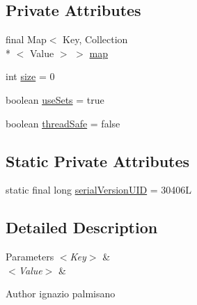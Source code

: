 \subsection*{Private Attributes}
\begin{DoxyCompactItemize}
\item 
final Map$<$ Key, Collection\\*
$<$ Value $>$ $>$ \hyperlink{classorg_1_1semanticweb_1_1owlapi_1_1util_1_1_multi_map_3_01_key_00_01_value_01_4_ab1a2523dd703a828e181a68f8761fcb4}{map}
\item 
int \hyperlink{classorg_1_1semanticweb_1_1owlapi_1_1util_1_1_multi_map_3_01_key_00_01_value_01_4_a47df3c0161c8f402af3d2fbf480d8c76}{size} = 0
\item 
boolean \hyperlink{classorg_1_1semanticweb_1_1owlapi_1_1util_1_1_multi_map_3_01_key_00_01_value_01_4_a5911e692ddf07ededda42d43d06b0215}{use\-Sets} = true
\item 
boolean \hyperlink{classorg_1_1semanticweb_1_1owlapi_1_1util_1_1_multi_map_3_01_key_00_01_value_01_4_a972fc408021234551d0ba45af4425a70}{thread\-Safe} = false
\end{DoxyCompactItemize}
\subsection*{Static Private Attributes}
\begin{DoxyCompactItemize}
\item 
static final long \hyperlink{classorg_1_1semanticweb_1_1owlapi_1_1util_1_1_multi_map_3_01_key_00_01_value_01_4_afc70b5b748fa16c34bc21ff88d01440e}{serial\-Version\-U\-I\-D} = 30406\-L
\end{DoxyCompactItemize}


\subsection{Detailed Description}

\begin{DoxyParams}{Parameters}
{\em $<$\-Key$>$} & \\
\hline
{\em $<$\-Value$>$} & \\
\hline
\end{DoxyParams}
\begin{DoxyAuthor}{Author}
ignazio palmisano 
\end{DoxyAuthor}


